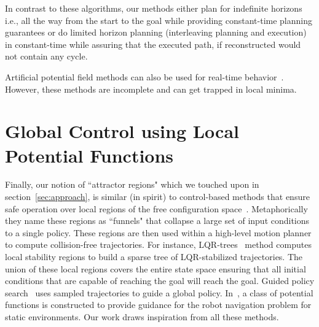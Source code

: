 \documentclass[a4paper]{report}
\begin{document}
In contrast to these algorithms, our methods either plan for indefinite horizons i.e., all the way from the start to the goal while providing constant-time planning guarantees or do limited horizon planning (interleaving planning and execution) in constant-time while assuring that the executed path, if reconstructed would not contain any cycle.

Artificial potential field methods can also be used for real-time behavior~\cite{warren1989global,vadakkepat2000evolutionary}. However, these methods are incomplete and can get trapped in local minima.

\section{Global Control using Local Potential Functions}
Finally, our notion of ``attractor regions" which we touched upon in section~\ref{sec:approach}, is similar (in spirit) to control-based methods that  ensure safe operation over local regions of the free configuration space~\cite{CRC03,CCR06,atkeson2008random,tedrake2010lqr, majumdar2017funnel}. Metaphorically they name these regions as ``funnels" that collapse a large set of input conditions to a single policy.
These regions are then used within a high-level motion planner to compute collision-free trajectories. For instance, LQR-trees~\cite{tedrake2010lqr} method computes local stability regions to build a sparse tree of LQR-stabilized trajectories. The union of these local regions covers the entire state space ensuring that all initial conditions that are capable of reaching the goal will reach the goal.
Guided policy search~\cite{levine2013guided} uses sampled trajectories to guide a global policy.
In~\cite{koditschek1987exact}, a class of potential functions is constructed to provide guidance for the robot navigation problem for static environments.
Our work draws inspiration from all these methods.
\end{document}
